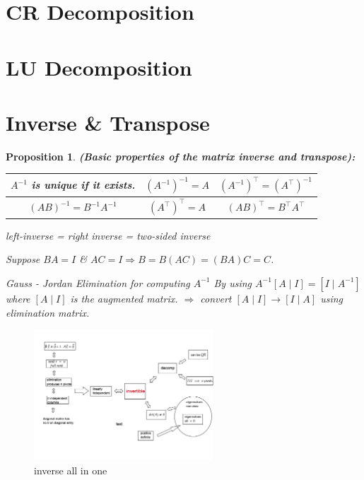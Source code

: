 \documentclass[14pt]{article}
\newtheorem{proposition}[theorem]{Proposition}
\theoremstyle{definition}
\theoremstyle{remark}
\begin{document}
\headrule

\section{CR Decomposition}


\headrule

\section{LU Decomposition}



\headrule

\section{Inverse \& Transpose}
\begin{proposition}
    \textbf{(Basic properties of the matrix inverse and transpose): }

    \begin{tabular}{c|c|c}
        $A^{-1}$ is unique if it exists. & $\left(A^{-1}\right)^{-1}=A$     & $\left(A^{-1}\right)^{\top}=\left(A^{\top}\right)^{-1}$ \\\hline
        $(A B)^{-1}=B^{-1} A^{-1}$       & $\left(A^{\top}\right)^{\top}=A$ & $(A B)^{\top}=B^{\top} A^{\top}$
    \end{tabular}

    left-inverse = right inverse = two-sided inverse

    Suppose $B A=I$ \& $A C=I \Rightarrow B=B(A C)=(B A) C=C$.

    Gauss - Jordan Elimination for computing $A^{-1}$ By using $A^{-1}[A \mid I]=\left[I \mid A^{-1}\right]$
    where $[A \mid I]$ is the augmented matrix.
    $\Rightarrow$ convert $[A \mid I] \rightarrow[I \mid A]$ using elimination matrix.


\end{proposition}
\begin{figure}[!htp]
    \centering
    \includegraphics[width=0.6\textwidth]{inverse.png}
    \caption{inverse all in one}
    \label{fig:enter-label}
\end{figure}
\end{document}
